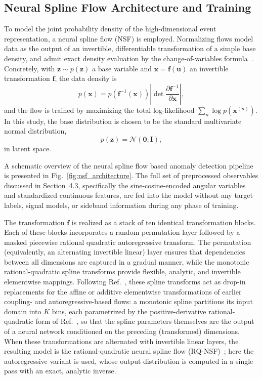 \documentclass[11pt,a4paper,twocolumn]{article}
\begin{document}
\subsection{Neural Spline Flow Architecture and Training}
\label{subsec:nsf}

To model the joint probability density of the high-dimensional event representation, a neural spline flow (NSF) is employed. Normalizing flows model data as the output of an invertible, differentiable transformation of a simple base density, and admit exact density evaluation by the change-of-variables formula~\cite{Durkan2019NSF}. Concretely, with $\mathbf{z}\sim p(\mathbf{z})$ a base variable and $\mathbf{x}=\mathbf{f}(\mathbf{u})$ an invertible transformation $\mathbf{f}$, the data density is
\begin{equation}
p(\mathbf{x}) = p\!\left(\mathbf{f}^{-1}(\mathbf{x})\right)\left|\det\frac{\partial \mathbf{f}^{-1}}{\partial \mathbf{x}}\right|,
\end{equation}
and the flow is trained by maximizing the total log-likelihood $\sum_n \log p(\mathbf{x}^{(n)})$. In this study, the base distribution is chosen to be the standard multivariate normal distribution,
\begin{equation}
p(\mathbf{z}) = \mathcal{N}(\mathbf{0}, \mathbf{I}),
\end{equation}
in latent space.

A schematic overview of the neural spline flow based anomaly detection pipeline is presented in Fig.~\ref{fig:nsf_architecture}. The full set of preprocessed observables discussed in Section~4.3, specifically the sine-cosine-encoded angular variables and standardized continuous features, are fed into the model without any target labels, signal models, or sideband information during any phase of training.

The transformation $\mathbf{f}$ is realized as a stack of ten identical transformation blocks. Each of these blocks incorporates a random permutation layer followed by a masked piecewise rational quadratic autoregressive transform. The permutation (equivalently, an alternating invertible linear) layer ensures that dependencies between all dimensions are captured in a gradual manner, while the monotonic rational-quadratic spline transforms provide flexible, analytic, and invertible elementwise mappings. Following Ref.~\cite{Durkan2019NSF}, these spline transforms act as drop-in replacements for the affine or additive elementwise transformations of earlier coupling- and autoregressive-based flows: a monotonic spline partitions its input domain into $K$ bins, each parametrized by the positive-derivative rational-quadratic form of Ref.~\cite{Durkan2019NSF}, so that the spline parameters themselves are the output of a neural network conditioned on the preceding (transformed) dimensions. When these transformations are alternated with invertible linear layers, the resulting model is the rational-quadratic neural spline flow (RQ-NSF)~\cite{Durkan2019NSF}; here the autoregressive variant is used, whose output distribution is computed in a single pass with an exact, analytic inverse.
\end{document}
